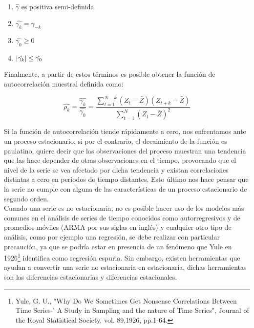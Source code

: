 \begin{enumerate}%

\item
$\hat{\gamma}$ es positiva semi-definida 

\item
$\hat{\gamma_k}=\hat{\gamma_{-k}}$

\item 
$\hat{\gamma_0} \geq 0$ 

\item
$\lvert\hat{\gamma_k}\rvert \leq \hat{\gamma_0}$

\end{enumerate}


Finalmente, a partir de estos términos es posible obtener la función de autocorrelación muestral definida como:

\begin{equation}
\hat{\rho_k}= \frac{\hat{\gamma_k}}{\hat{\gamma_0}}=\frac{\sum_{t=1}^{N-k}(Z_t-\bar{Z})(Z_{t+k}-\bar{Z})}{\sum_{t=1}^{N}(Z_t- \bar{Z} )^2}
\end{equation}

Si la función de autocorrelación tiende rápidamente a cero, nos enfrentamos ante un proceso estacionario; si por el contrario, el decaimiento de la función es paulatino, quiere decir que las observaciones del proceso muestran una tendencia que las hace depender de  otras observaciones en el tiempo, provocando que el nivel de la serie se vea afectado por dicha tendencia y existan correlaciones distintas a cero en periodos de tiempo distantes. Esto último nos hace pensar que la serie no cumple con alguna de las características de un proceso estacionario de segundo orden. \\


Cuando una serie es no estacionaria, no es posible hacer uso de los modelos más comunes en el análisis de series de tiempo conocidos como autorregresivos y de promedios móviles (ARMA por sus siglas en inglés) y cualquier otro tipo de análisis, como por ejemplo una regresión, se debe realizar con particular precaución, ya que se podría estar en presencia de un fenómeno que Yule en 1926\footnote{Yule, G. U., "Why Do We Sometimes Get Nonsense Correlations Between Time Series-' A Study in Sampling and the nature of Time Series", Journal of the Royal Statistical Society, vol. 89,1926, pp.1-64.} identifica como regresión espuria. Sin embargo, existen herramientas que ayudan a convertir una serie no estacionaria en estacionaria, dichas herramientas son las diferencias estacionarias y diferencias estacionales.\\

